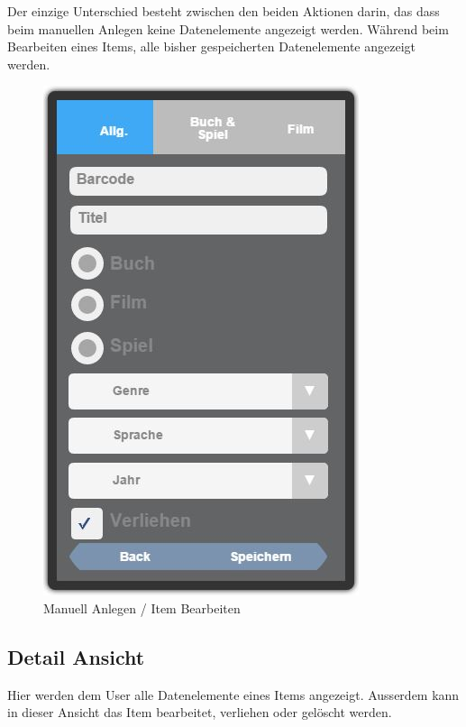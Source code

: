 Der einzige Unterschied besteht zwischen den beiden Aktionen darin, das dass beim manuellen Anlegen keine Datenelemente angezeigt werden. Während beim Bearbeiten eines Items, alle bisher gespeicherten Datenelemente angezeigt werden.

\begin{figure}[htbp]
	\centering
	\includegraphics[scale=0.5]{pic/GUI/Manuell}
	\caption{Manuell Anlegen / Item Bearbeiten}
\end{figure}

\subsection{Detail Ansicht}

Hier werden dem User alle Datenelemente eines Items angezeigt. Ausserdem kann in dieser Ansicht das Item bearbeitet, verliehen oder gelöscht werden.

